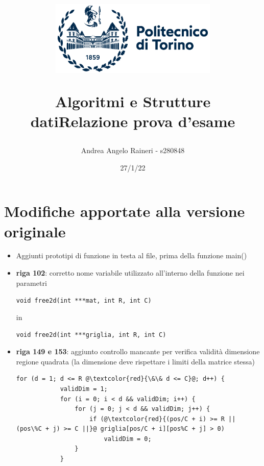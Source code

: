 \documentclass[11pt, a4paper, titlepage]{article}
\newcommand{\code}[1]{\colorbox{light-gray}{\texttt{#1}}}
\begin{document}
    \title{
        \begin{figure}[t]
            \includegraphics[width=8cm]{logo.png}
            \centering
        \end{figure}
            \textbf{Algoritmi e Strutture dati\break Relazione prova d'esame}
        }
    \author{Andrea Angelo Raineri - s280848}
    \date{27/1/22}
    \maketitle

    \section{Modifiche apportate alla versione originale}
        \begin{itemize}
            \item Aggiunti prototipi di funzione in testa al file, prima della funzione main()
            \item \textbf{riga 102}: corretto nome variabile utilizzato all'interno della funzione nei parametri
            
                \code{void free2d(int ***mat, int R, int C)}

                in

                \code{void free2d(int ***griglia, int R, int C)}

            \item \textbf{riga 149 e 153}: aggiunto controllo mancante per verifica validità dimensione regione quadrata (la dimensione deve rispettare i limiti della matrice stessa)
            
            \begin{lstlisting}[firstnumber=149]
            for (d = 1; d <= R @\textcolor{red}{\&\& d <= C}@; d++) {
            validDim = 1;
            for (i = 0; i < d && validDim; i++) {
                for (j = 0; j < d && validDim; j++) {
                    if (@\textcolor{red}{(pos/C + i) >= R || (pos\%C + j) >= C ||}@ griglia[pos/C + i][pos%C + j] > 0)
                        validDim = 0;
                }
            }
            \end{lstlisting}
        \end{itemize}
\end{document}

